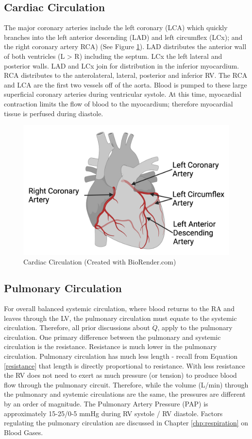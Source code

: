 \subsection{Cardiac Circulation}

The major coronary arteries include the left coronary (LCA) which quickly branches into the left anterior descending (LAD) and left circumflex (LCx); and the right coronary artery RCA) (See Figure \ref{fig:Cardiac_Circulation}). LAD distributes the anterior wall of both ventricles (L > R) including the septum. LCx the left lateral and posterior walls. LAD and LCx join for distribution in the inferior myocardium. RCA distributes to the anterolateral, lateral, posterior and inferior RV. The RCA and LCA are the first two vessels off of the aorta. Blood is pumped to these large superficial coronary arteries during ventricular systole. At this time, myocardial contraction limits the flow of blood to the myocardium; therefore myocardial tissue is perfused during diastole.

\begin{figure}[!h]
    \centering
    \includegraphics[width=0.5\linewidth]{./figure/Cardiac_Circulation.png}
    \caption{Cardiac Circulation \footnotesize{(Created with BioRender.com)}}
    \label{fig:Cardiac_Circulation}
\end{figure}

\subsection{Pulmonary Circulation}
For overall balanced systemic circulation, where blood returns to the RA and leaves through the LV, the pulmonary circulation must equate to the systemic circulation. Therefore, all prior discussions about $\dot{Q}$, apply to the pulmonary circulation. One primary difference between the pulmonary and systemic circulation is the resistance. Resistance is much lower in the pulmonary circulation. Pulmonary circulation has much less length - recall from Equation \ref{resistance} that length is directly proportional to resistance. With less resistance the RV does not need to exert as much pressure (or tension) to produce blood flow through the pulmonary circuit. Therefore, while the volume (L/min) through the pulmonary and systemic circulations are the same, the pressures are different by an order of magnitude. The Pulmonary Artery Pressure (PAP) is approximately 15-25/0-5 mmHg during RV systole / RV diastole. Factors regulating the pulmonary circulation are discussed in Chapter \ref{chp:respiration} on Blood Gases.

